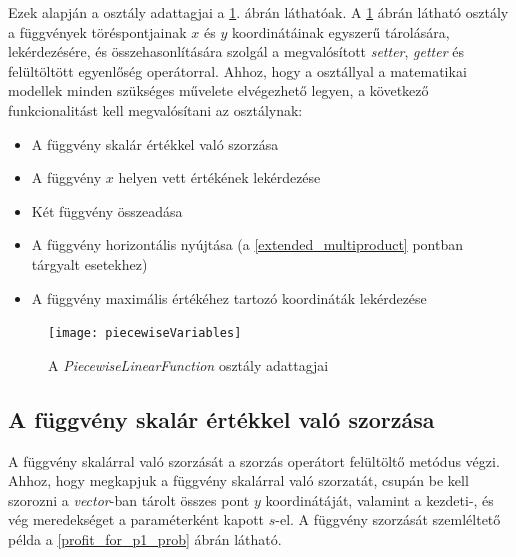 Ezek alapján a  osztály adattagjai a \ref{piecewise_variables}. ábrán láthatóak.
A \ref{piecewise_variables} ábrán látható  osztály a függvények töréspontjainak $x$ és $y$ koordinátáinak egyszerű tárolására, lekérdezésére, és összehasonlítására szolgál a megvalósított \textit{setter}, \textit{getter} és felültöltött egyenlőség operátorral.
Ahhoz, hogy a  osztállyal a matematikai modellek minden szükséges művelete elvégezhető legyen, a következő funkcionalitást kell megvalósítani az osztálynak:
\begin{itemize}
\item A függvény skalár értékkel való szorzása
\item A függvény $x$ helyen vett értékének lekérdezése
\item Két függvény összeadása
\item A függvény horizontális nyújtása (a \ref{extended_multiproduct} pontban tárgyalt esetekhez)
\item A függvény maximális értékéhez tartozó koordináták lekérdezése
\end{itemize}
\begin{figure}[H]
\begin{center}
\texttt{[image: piecewiseVariables]}
\caption{A \textit{PiecewiseLinearFunction} osztály adattagjai}
\label{piecewise_variables}
\end{center}
\end{figure}  
\subsection{A függvény skalár értékkel való szorzása} \label{multiplyByScalar}
A függvény skalárral való szorzását a szorzás operátort felültöltő metódus végzi.
Ahhoz, hogy megkapjuk a függvény skalárral való szorzatát, csupán be kell szorozni a \textit{vector}-ban tárolt összes pont $y$ koordinátáját, valamint a kezdeti-, és vég meredekséget a paraméterként kapott $s$-el.
A függvény szorzását szemléltető példa a \ref{profit_for_p1_prob} ábrán látható.
